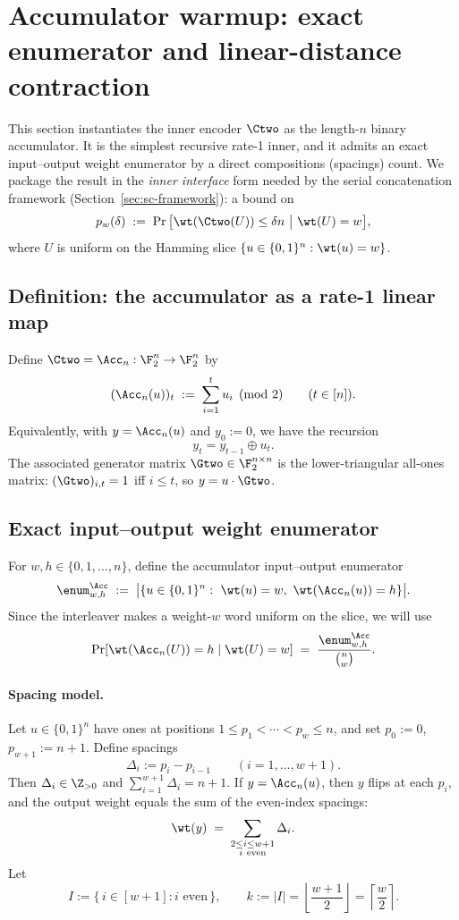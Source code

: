 
\section{Accumulator warmup: exact enumerator and linear-distance contraction}
\label{sec:inner-accumulator}

This section instantiates the inner encoder \(\Ctwo\) as the length-\(n\) binary accumulator.
It is the simplest recursive rate-1 inner, and it admits an exact input--output weight enumerator by a direct
compositions (spacings) count. We package the result in the \emph{inner interface} form needed by the
serial concatenation framework (Section~\ref{sec:sc-framework}): a bound on
\[
p_w(\delta) \;:=\; \Pr\big[\wt(\Ctwo(U))\le \delta n \ \big|\ \wt(U)=w\big],
\]
where \(U\) is uniform on the Hamming slice \(\{u\in\{0,1\}^n:\wt(u)=w\}\).

\subsection{Definition: the accumulator as a rate-1 linear map}
\label{subsec:acc-def}

Define \(\Ctwo=\Acc_n:\F_2^n\to\F_2^n\) by
\[
(\Acc_n(u))_t \;:=\; \sum_{i=1}^t u_i \pmod 2
\qquad (t\in[n]).
\]
Equivalently, with \(y=\Acc_n(u)\) and \(y_0:=0\), we have the recursion
\[
y_t = y_{t-1}\oplus u_t.
\]
The associated generator matrix \(\Gtwo\in\F_2^{n\times n}\) is the lower-triangular all-ones matrix:
\((\Gtwo)_{i,t}=1\) iff \(i\le t\), so \(y=u\cdot \Gtwo\).

\subsection{Exact input--output weight enumerator}
\label{subsec:acc-enum}

For \(w,h\in\{0,1,\dots,n\}\), define the accumulator input--output enumerator
\[
\enum^{\Acc}_{w,h}
\;:=\;
\bigl|\{u\in\{0,1\}^n:\ \wt(u)=w,\ \wt(\Acc_n(u))=h\}\bigr|.
\]
Since the interleaver makes a weight-\(w\) word uniform on the slice, we will use
\[
\Pr[\wt(\Acc_n(U))=h\mid \wt(U)=w] \;=\; \frac{\enum^{\Acc}_{w,h}}{\binom{n}{w}}.
\]

\paragraph{Spacing model.}
Let \(u\in\{0,1\}^n\) have ones at positions \(1\le p_1<\cdots<p_w\le n\), and set
\(p_0:=0\), \(p_{w+1}:=n+1\). Define spacings
\[
\Delta_i:=p_i-p_{i-1}\qquad(i=1,\dots,w+1).
\]
Then \(\Delta_i\in\Z_{>0}\) and \(\sum_{i=1}^{w+1}\Delta_i=n+1\).
If \(y=\Acc_n(u)\), then \(y\) flips at each \(p_i\), and the output weight equals the sum of the even-index spacings:
\begin{equation}
\label{eq:acc-weight-even-spacings}
\wt(y) \;=\; \sum_{\substack{2\le i\le w+1\\ i\ \mathrm{even}}}\Delta_i.
\end{equation}
Let
\[
I := \{\,i\in[w+1]: i\text{ even}\,\},
\qquad
k:=|I|=\left\lfloor\frac{w+1}{2}\right\rfloor=\left\lceil\frac{w}{2}\right\rceil.
\]


